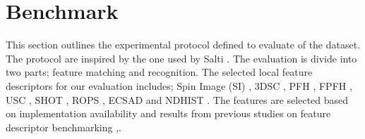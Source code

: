 \documentclass[10pt,twocolumn,letterpaper]{article}
\begin{document}

\section{Benchmark}\label{sec:benchmark}
This section outlines the experimental protocol defined to evaluate of the dataset. The protocol are inspired by the one used by Salti \etal \cite{Salti2014}. The evaluation is divide into two parts; feature matching and recognition. The selected local feature descriptors for our evaluation includes; Spin Image (SI) \cite{Johnson1999}, 3DSC \cite{Frome2004}, PFH \cite{Rusu2008}, FPFH \cite{Fpfh2009}, USC \cite{usc2010}, SHOT \cite{Tombari2010}, ROPS \cite{Guo2013}, ECSAD \cite{Ecsad2015} and NDHIST \cite{Buch2016}. The features are selected based on implementation availability and results from previous studies on feature descriptor benchmarking \cite{Guo2015},\cite{Buch2016}. 
\end{document}
